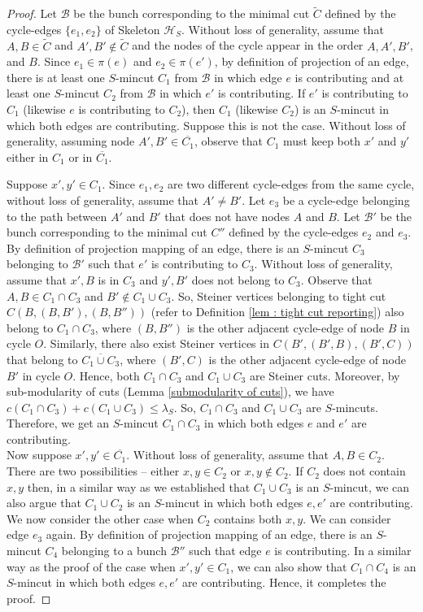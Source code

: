 \documentclass[letterpaper,11pt]{article}
\begin{document}
\begin{proof}
    Let ${\mathcal B}$ be the bunch corresponding to the minimal cut $\tilde C$ defined by the cycle-edges $\{e_1,e_2\}$ of Skeleton ${\mathcal H}_S$.  Without loss of generality, assume that $A,B\in \tilde C$ and $A',B'\notin {\tilde C}$ and the nodes of the cycle appear in the order $A,A',B'$, and $B$.
Since $e_1\in \pi(e)$ and $e_2\in \pi(e')$, by definition of projection of an edge, there is at least one $S$-mincut $C_1$ from ${\mathcal B}$ in which edge $e$ is contributing and at least one $S$-mincut $C_2$ from ${\mathcal B}$ in which $e'$ is contributing. 
If $e'$ is contributing to $C_1$ (likewise $e$ is contributing to $C_2$), then $C_1$ (likewise $C_2$) is an $S$-mincut in which both edges are contributing. Suppose this is not the case. 
Without loss of generality, assuming node $A',B'\in \overline{C_1}$, observe that $C_1$ must keep both $x'$ and $y'$ either in $C_1$ or in $\overline{C_1}$. 
    
    Suppose $x',y'\in C_1$. Since $e_1,e_2$ are two different cycle-edges from the same cycle, without loss of generality, assume that $A'\ne B'$. Let $e_3$ be a cycle-edge belonging to the path between $A'$ and $B'$ that does not have nodes $A$ and $B$. Let ${\mathcal B}'$ be the bunch corresponding to the minimal cut $C''$ 
defined by the cycle-edges $e_2$ and $e_3$.
By definition of projection mapping of an edge, there is an $S$-mincut $C_3$ belonging to ${\mathcal B}'$ such that $e'$ is contributing to $C_3$. Without loss of generality, assume that $x',B$ is in $C_3$ and $y',B'$ does not belong to $C_3$. Observe that $A,B\in C_1\cap C_3$ and $B'\notin C_1\cup C_3$. So, Steiner vertices belonging to tight cut $C(B,(B,B'),(B,B''))$ (refer to Definition \ref{lem : tight cut reporting}) also belong to $C_1\cap C_3$, where $(B,B'')$ is the other adjacent cycle-edge of node $B$ in cycle $O$. Similarly, there also exist Steiner vertices in $C(B',(B',B),(B',C))$ that belong to $\overline{C_1\cup C_3}$, where $(B',C)$ is the other adjacent cycle-edge of node $B'$ in cycle $O$. Hence, both $C_1\cap C_3$ and $C_1\cup C_3$ are Steiner cuts. Moreover, by sub-modularity of cuts (Lemma \ref{submodularity of cuts}), we have $c(C_1\cap C_3)+c(C_1\cup C_3)\le \lambda_S$. So, $C_1\cap C_3$ and $C_1\cup C_3$ are $S$-mincuts. Therefore, we get an $S$-mincut $C_1\cap C_3$ in which both edges $e$ and $e'$ are contributing. \\ 
    Now suppose $x',y'\in \overline{C_1}$. Without loss of generality, assume that $A,B\in C_2$. There are two possibilities -- either $x,y\in C_2$ or $x,y\notin C_2$. If $C_2$ does not contain $x,y$ then, in a similar way as we established that $C_1\cup C_3$ is an $S$-mincut, we can also argue that $C_1\cup C_2$ is an $S$-mincut in which both edges $e,e'$ are contributing. We now consider the other case when $C_2$ contains both $x,y$. We can consider edge $e_3$ again. By definition of projection mapping of an edge, there is an $S$-mincut $C_4$ belonging to a bunch ${\mathcal B}''$ such that edge $e$ is contributing. In a similar way as the proof of the case when $x',y'\in C_1$, we can also show that $C_1\cap C_4$ is an $S$-mincut in which both edges $e,e'$ are contributing. Hence, it completes the proof.  
\end{proof}
\end{document}

